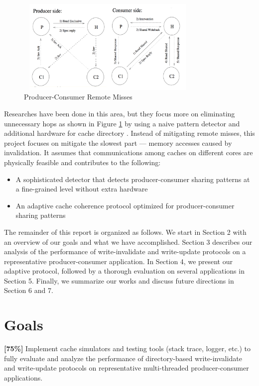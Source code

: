 \documentclass[conference]{IEEEtran}
\begin{document}
\begin{figure}[!h]
\centering
\captionsetup{justification=centering}
\includegraphics[width=3.5in,height=1.8in]{write_invalidate_hops.png}
\caption{Producer-Consumer Remote Misses}
\label{write_invalidate_hops}
\end{figure}
\FloatBarrier

Researches have been done in this area, but they focus more on eliminating unnecessary hops as shown in Figure \ref{write_invalidate_hops} by using a naive pattern detector and additional hardware for cache directory \cite{work1}. Instead of mitigating remote misses, this project focuses on mitigate the slowest part --- memory accesses caused by invalidation. It assumes that communications among caches on different cores are physically feasible and contributes to the following:
\begin{itemize}
  \item A sophisticated detector that detects producer-consumer sharing patterns at a fine-grained level without extra hardware
  \item An adaptive cache coherence protocol optimized for producer-consumer sharing patterns
\end{itemize}

The remainder of this report is organized as follows. We start in Section 2 with an overview of our goals and what we have accomplished. Section 3 describes our analysis of the performance of write-invalidate and write-update protocols on a representative producer-consumer application. In Section 4, we present our adaptive protocol, followed by a thorough evaluation on several applications in Section 5. Finally, we summarize our works and discuss future directions in Section 6 and 7.


\section{Goals}

\textbf{[75\%]} Implement cache simulators and testing tools (stack trace, logger, etc.) to fully evaluate and analyze the performance of directory-based write-invalidate and write-update protocols on representative multi-threaded producer-consumer applications.
\end{document}
